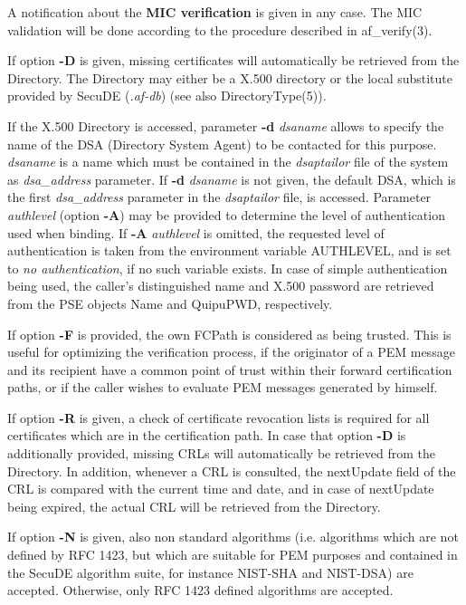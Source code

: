 A notification about the {\bf MIC verification} is given in any case. The MIC validation will be done
according to the procedure described in af\_verify(3). 

If option {\bf -D} is given, missing certificates will automatically be retrieved from the Directory.
The Directory may either be a X.500 directory or the local substitute provided by 
SecuDE ({\em .af-db}) (see also DirectoryType(5)).

If the X.500 Directory is accessed, parameter {\bf -d} {\em dsaname} allows to specify the 
name of the DSA (Directory System Agent) to be contacted for this purpose. 
{\em dsaname} is a name which must be contained in the 
{\em dsaptailor} file of the system as {\em dsa\_address} parameter. If {\bf -d} {\em dsaname} is
not given, the default DSA, which is the first {\em dsa\_address} parameter in the {\em dsaptailor} 
file, is accessed.
Parameter {\em authlevel} (option {\bf -A}) may be provided to determine the level of authentication used when binding. If {\bf -A} {\em authlevel} is omitted, the requested 
level of authentication is taken from the environment variable AUTHLEVEL, and is set to {\em no 
authentication}, if no such variable exists.
In case of simple authentication being used, the caller's distinguished name and
X.500 password are retrieved from the PSE objects Name and QuipuPWD, respectively.

If option {\bf -F} is provided, the own FCPath is considered as being trusted.
This is useful for optimizing the verification process,
if the originator of a PEM message and its recipient have a common point of trust
within their forward certification paths, or if the caller wishes to evaluate PEM messages
generated by himself.

If option {\bf -R} is given, a check of certificate revocation lists is required for all certificates
which are in the certification path. In case that option {\bf -D} is additionally provided, missing CRLs will
automatically be retrieved from the Directory. In addition, whenever a CRL is consulted, the 
nextUpdate field of the CRL is compared with the current time and date, and in case of nextUpdate
being expired, the actual CRL will be retrieved from the Directory. 

If option {\bf -N}
is given, also non standard algorithms (i.e. algorithms which are not defined by RFC 1423,
but which are suitable for PEM purposes and contained in the SecuDE algorithm suite, for instance
NIST-SHA and NIST-DSA) are accepted. Otherwise, only RFC 1423 defined algorithms are accepted.


